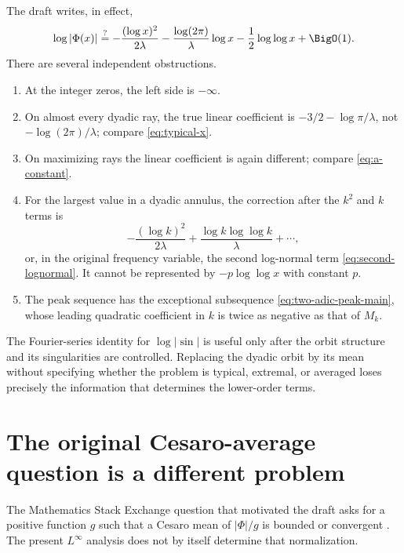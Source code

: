 \documentclass[11pt,oneside]{article}
\theoremstyle{definition}
\theoremstyle{remark}
\newcommand{\PhiF}{\Phi}
\begin{document}
The draft \cite{proveitDraft} writes, in effect,
\begin{equation}
 \log|\PhiF(x)|
 \stackrel{?}{=}
 -\frac{(\log x)^2}{2\lambda}
 -\frac{\log(2\pi)}{\lambda}\log x
 -\frac12\log\log x+\BigO(1).
 \label{eq:draft-proposed}
\end{equation}
There are several independent obstructions.
\begin{enumerate}
 \item At the integer zeros, the left side is \(-\infty\).
 \item On almost every dyadic ray, the true linear coefficient is
 \(-3/2-\log\pi/\lambda\), not \(-\log(2\pi)/\lambda\); compare
 \eqref{eq:typical-x}.
 \item On maximizing rays the linear coefficient is again different;
 compare \eqref{eq:a-constant}.
 \item For the largest value in a dyadic annulus, the correction after the
 \(k^2\) and \(k\) terms is
 \[
  -\frac{(\log k)^2}{2\lambda}
  +\frac{\log k\log\log k}{\lambda}+\cdots,
 \]
 or, in the original frequency variable, the second log-normal term
 \eqref{eq:second-lognormal}.  It cannot be represented by
 \(-p\log\log x\) with constant \(p\).
 \item The peak sequence has the exceptional subsequence
 \eqref{eq:two-adic-peak-main}, whose leading quadratic coefficient in
 \(k\) is twice as negative as that of \(M_k\).
\end{enumerate}
The Fourier-series identity for \(\log|\sin|\) is useful only after the orbit
structure and its singularities are controlled.  Replacing the dyadic orbit
by its mean without specifying whether the problem is typical, extremal, or
averaged loses precisely the information that determines the lower-order
terms.

\section{The original Cesaro-average question is a different problem}
\label{sec:averages}

The Mathematics Stack Exchange question that motivated the draft asks for a
positive function \(g\) such that a Cesaro mean of \(|\PhiF|/g\) is bounded or
convergent \cite{reshetnikovMSEdecay}.  The present \(L^\infty\) analysis does
not by itself determine that normalization.
\end{document}

